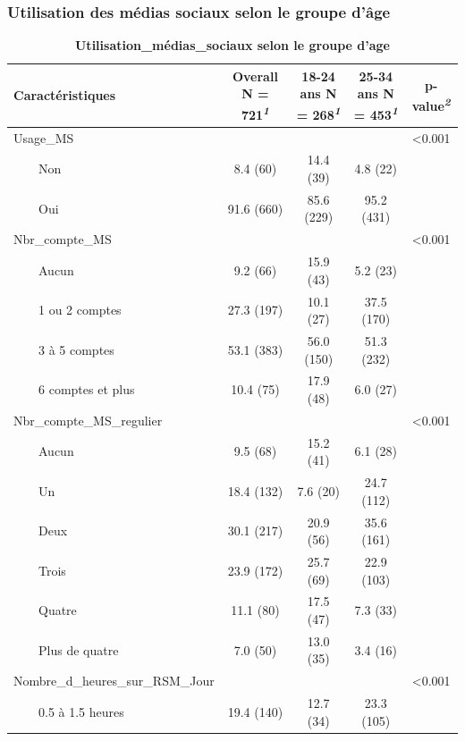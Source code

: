 \documentclass[
]{article}
\begin{document}
\hypertarget{utilisation-des-muxe9dias-sociaux-selon-le-groupe-duxe2ge}{%
\subsubsection{Utilisation des médias sociaux selon le groupe
d'âge}\label{utilisation-des-muxe9dias-sociaux-selon-le-groupe-duxe2ge}}

\newpage
\begin{table}[!t]
\caption{\label{tab:unnamed-chunk-8}\textbf{Utilisation\_médias\_sociaux selon le groupe d'age}} 
\fontsize{12.0pt}{14.4pt}\selectfont
\begin{tabular*}{\linewidth}{@{\extracolsep{\fill}}lcccc}
\toprule
\textbf{Caractéristiques} & \textbf{Overall}  N = 721\textsuperscript{\textit{1}} & \textbf{18-24 ans}  N = 268\textsuperscript{\textit{1}} & \textbf{25-34 ans}  N = 453\textsuperscript{\textit{1}} & \textbf{p-value}\textsuperscript{\textit{2}} \\ 
\midrule\addlinespace[2.5pt]
Usage\_MS &  &  &  & <0.001 \\ 
    Non & 8.4 (60) & 14.4 (39) & 4.8 (22) &  \\ 
    Oui & 91.6 (660) & 85.6 (229) & 95.2 (431) &  \\ 
Nbr\_compte\_MS &  &  &  & <0.001 \\ 
    Aucun & 9.2 (66) & 15.9 (43) & 5.2 (23) &  \\ 
    1 ou 2 comptes & 27.3 (197) & 10.1 (27) & 37.5 (170) &  \\ 
    3 à 5 comptes & 53.1 (383) & 56.0 (150) & 51.3 (232) &  \\ 
    6 comptes et plus & 10.4 (75) & 17.9 (48) & 6.0 (27) &  \\ 
Nbr\_compte\_MS\_regulier &  &  &  & <0.001 \\ 
    Aucun & 9.5 (68) & 15.2 (41) & 6.1 (28) &  \\ 
    Un & 18.4 (132) & 7.6 (20) & 24.7 (112) &  \\ 
    Deux & 30.1 (217) & 20.9 (56) & 35.6 (161) &  \\ 
    Trois & 23.9 (172) & 25.7 (69) & 22.9 (103) &  \\ 
    Quatre & 11.1 (80) & 17.5 (47) & 7.3 (33) &  \\ 
    Plus de quatre & 7.0 (50) & 13.0 (35) & 3.4 (16) &  \\ 
Nombre\_d\_heures\_sur\_RSM\_Jour &  &  &  & <0.001 \\ 
    0.5 à 1.5 heures & 19.4 (140) & 12.7 (34) & 23.3 (105) &  \\ 

\end{tabular*}
\end{table}
\end{document}
